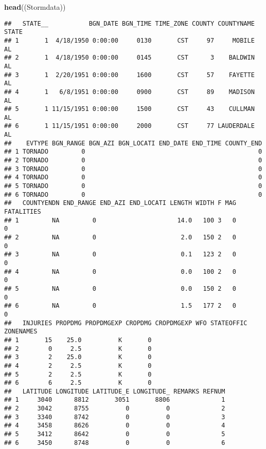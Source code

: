 \documentclass[]{article}
\newenvironment{Shaded}{\begin{snugshade}}{\end{snugshade}}
\newcommand{\KeywordTok}[1]{\textcolor[rgb]{0.13,0.29,0.53}{\textbf{#1}}}
\newcommand{\NormalTok}[1]{#1}
\begin{document}
\begin{Shaded}
\begin{Highlighting}[]
\KeywordTok{head}\NormalTok{((Stormdata))}
\end{Highlighting}
\end{Shaded}

\begin{verbatim}
##   STATE__           BGN_DATE BGN_TIME TIME_ZONE COUNTY COUNTYNAME STATE
## 1       1  4/18/1950 0:00:00     0130       CST     97     MOBILE    AL
## 2       1  4/18/1950 0:00:00     0145       CST      3    BALDWIN    AL
## 3       1  2/20/1951 0:00:00     1600       CST     57    FAYETTE    AL
## 4       1   6/8/1951 0:00:00     0900       CST     89    MADISON    AL
## 5       1 11/15/1951 0:00:00     1500       CST     43    CULLMAN    AL
## 6       1 11/15/1951 0:00:00     2000       CST     77 LAUDERDALE    AL
##    EVTYPE BGN_RANGE BGN_AZI BGN_LOCATI END_DATE END_TIME COUNTY_END
## 1 TORNADO         0                                               0
## 2 TORNADO         0                                               0
## 3 TORNADO         0                                               0
## 4 TORNADO         0                                               0
## 5 TORNADO         0                                               0
## 6 TORNADO         0                                               0
##   COUNTYENDN END_RANGE END_AZI END_LOCATI LENGTH WIDTH F MAG FATALITIES
## 1         NA         0                      14.0   100 3   0          0
## 2         NA         0                       2.0   150 2   0          0
## 3         NA         0                       0.1   123 2   0          0
## 4         NA         0                       0.0   100 2   0          0
## 5         NA         0                       0.0   150 2   0          0
## 6         NA         0                       1.5   177 2   0          0
##   INJURIES PROPDMG PROPDMGEXP CROPDMG CROPDMGEXP WFO STATEOFFIC ZONENAMES
## 1       15    25.0          K       0                                    
## 2        0     2.5          K       0                                    
## 3        2    25.0          K       0                                    
## 4        2     2.5          K       0                                    
## 5        2     2.5          K       0                                    
## 6        6     2.5          K       0                                    
##   LATITUDE LONGITUDE LATITUDE_E LONGITUDE_ REMARKS REFNUM
## 1     3040      8812       3051       8806              1
## 2     3042      8755          0          0              2
## 3     3340      8742          0          0              3
## 4     3458      8626          0          0              4
## 5     3412      8642          0          0              5
## 6     3450      8748          0          0              6
\end{verbatim}
\end{document}
